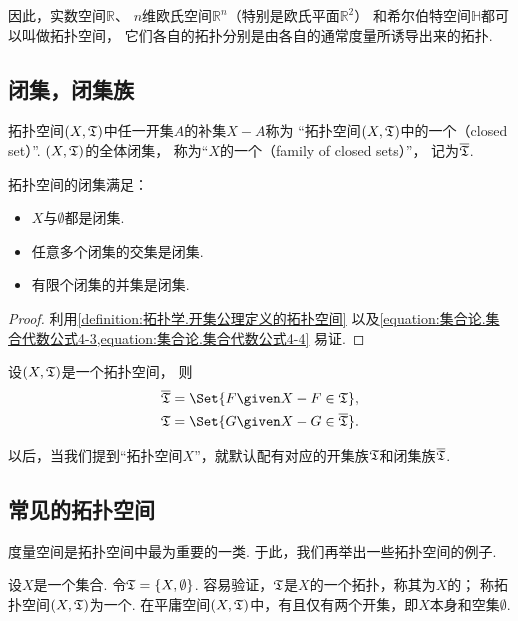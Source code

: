 因此，实数空间\(\mathbb{R}\)、
\(n\)维欧氏空间\(\mathbb{R}^n\)（特别是欧氏平面\(\mathbb{R}^2\)）
和希尔伯特空间\(\mathbb{H}\)都可以叫做拓扑空间，
它们各自的拓扑分别是由各自的通常度量所诱导出来的拓扑.

\subsection{闭集，闭集族}
\begin{definition}\label{definition:拓扑空间.闭集的定义}
拓扑空间\((X,\mathfrak T)\)中任一开集\(A\)的补集\(X-A\)称为
“拓扑空间\((X,\mathfrak T)\)中的一个（closed set）”.
\((X,\mathfrak T)\)的全体闭集，
称为“\(X\)的一个（family of closed sets）”，
记为\(\overline{\mathfrak T}\).
\end{definition}

\begin{property}
拓扑空间的闭集满足：\begin{itemize}
	\item \(X\)与\(\emptyset\)都是闭集.
	\item 任意多个闭集的交集是闭集.
	\item 有限个闭集的并集是闭集.
\end{itemize}
\begin{proof}
利用\cref{definition:拓扑学.开集公理定义的拓扑空间}
以及\cref{equation:集合论.集合代数公式4-3,equation:集合论.集合代数公式4-4}
易证.
\end{proof}
\end{property}

\begin{theorem}
设\((X,\mathfrak T)\)是一个拓扑空间，
则\begin{gather*}
	\oT = \Set{ F \given X-F \in \T }, \\
	\T = \Set{ G \given X-G \in \oT }.
\end{gather*}
\end{theorem}
以后，当我们提到“拓扑空间\(X\)”，就默认配有对应的开集族\(\mathfrak T\)和闭集族\(\overline{\mathfrak T}\).

\subsection{常见的拓扑空间}
度量空间是拓扑空间中最为重要的一类.
于此，我们再举出一些拓扑空间的例子.

\begin{example}[平庸空间]
设\(X\)是一个集合.
令\(\mathfrak T=\{X,\emptyset\}\).
容易验证，\(\mathfrak T\)是\(X\)的一个拓扑，称其为\(X\)的；
称拓扑空间\((X,\mathfrak T)\)为一个.
在平庸空间\((X,\mathfrak T)\)中，有且仅有两个开集，即\(X\)本身和空集\(\emptyset\).
\end{example}

